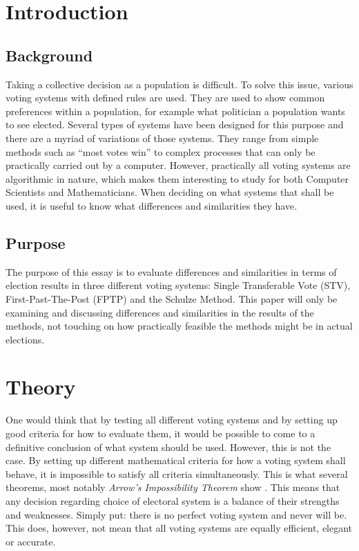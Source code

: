 \documentclass[12pt]{article}
\begin{document}


\pagebreak




\begin{abstract}
\end{abstract}

\pagebreak

\tableofcontents

\pagebreak

\section{Introduction}
\subsection{Background}
Taking a collective decision as a population is difficult. To solve this issue, various voting systems with defined rules are used. They are used to show common preferences within a population, for example what politician a population wants to see elected. Several types of systems have been designed for this purpose and there are a myriad of variations of those systems. They range from simple methods such as “most votes win” to complex processes that can only be practically carried out by a computer. However, practically all voting systems are algorithmic in nature, which makes them interesting to study for both Computer Scientists and Mathematicians. When deciding on what systems that shall be used, it is useful to know what differences and similarities they have.
\subsection{Purpose}
The purpose of this essay is to evaluate differences and similarities in terms of election results in three different voting systems: Single Transferable Vote (STV), First-Past-The-Post (FPTP) and the Schulze Method. This paper will only be examining and discussing differences and similarities in the results of the methods, not touching on how practically feasible the methods might be in actual elections.
\pagebreak
\section{Theory}
One would think that by testing all different voting systems and by setting up good criteria for how to evaluate them, it would be possible to come to a definitive conclusion of what system should be used. However, this is not the case. By setting up different mathematical criteria for how a voting system shall behave, it is impossible to satisfy all criteria simultaneously. This is what several theorems, most notably \textit{Arrow's Impossibility Theorem} show \autocite{arrow1950difficulty}. This means that any decision regarding choice of electoral system is a balance of their strengths and weaknesses. Simply put: there is no perfect voting system and never will be. This does, however, not mean that all voting systems are equally efficient, elegant or accurate.
\end{document}
